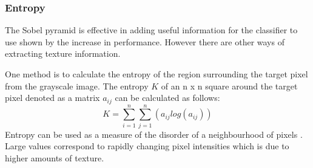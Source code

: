 \documentclass[12pt]{IIBproject}
\begin{document}
\subsubsection{Entropy}
The Sobel pyramid is effective in adding useful information for the classifier to use shown by the increase in performance. However there are other ways of extracting texture information.
 
One method is to calculate the entropy of the region surrounding the target pixel from the grayscale image. The entropy $K$ of an n x n square around the target pixel denoted as a matrix ${a_{ij}}$ can be calculated as follows:
\begin{equation}
K=
\sum_{i=1}^{n}\sum_{j=1}^{n}(a_{ij} log(a_{ij}))
\end{equation}
Entropy can be used as a measure of the disorder of a neighbourhood of pixels \cite{jernigan1984entropy}. Large values correspond to rapidly changing pixel intensities which is due to higher amounts of texture. 
\end{document}
